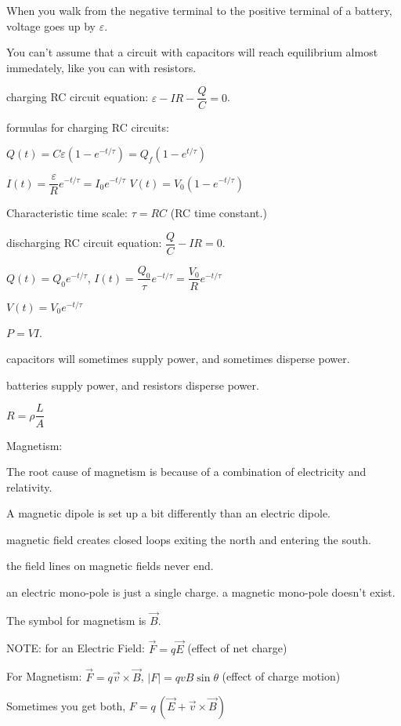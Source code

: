 \documentclass[12pt]{article}
\newcommand \dstyle \displaystyle
\begin{document}
When you walk from the negative terminal to the positive terminal of a battery,
voltage goes up by $\varepsilon$.

You can't assume that a circuit with capacitors will reach equilibrium almost immedately,
like you can with resistors.

charging RC circuit equation: $\varepsilon - IR - \dfrac Q C = 0$.

formulas for charging RC circuits:

$\dstyle Q(t) = C \varepsilon \! \left(1 - e^{-t / \tau}\right) = Q_f \! \left(1 - e^{t / \tau}\right)$

$\dstyle I(t) = \dfrac \varepsilon R e^{-t/\tau} = I_0 e^{-t/\tau}$
\hspace{20px}
$V(t) = V_0 \left(1 - e^{-t/\tau}\right)$

Characteristic time scale:
$\tau = RC$ (RC time constant.)

discharging RC circuit equation: $\dfrac Q C - I R = 0$.

$Q(t) = Q_0 e^{-t/\tau}$, $I(t) = \dfrac{Q_0} \tau e^{-t/\tau} = \dfrac{V_0} R e^{-t/\tau}$

$V(t) = V_0 e^{-t/\tau}$

$P = V I$.

\newpage

capacitors will sometimes supply power, and sometimes disperse power.

batteries supply power, and resistors disperse power.

$R = \rho \dfrac L A$

{\Large Magnetism:}

The root cause of magnetism is because of a combination of electricity and relativity.

A magnetic dipole is set up a bit differently than an electric dipole.

magnetic field creates closed loops exiting the north and entering the south.

the field lines on magnetic fields never end.

an electric mono-pole is just a single charge. a magnetic mono-pole doesn't exist.

The symbol for magnetism is $\vec B$.

NOTE: for an Electric Field: $\vec F = q \vec E$ (effect of net charge)

For Magnetism: $\vec F = q \vec v \times \vec B$, $|F| = q v B \sin \theta$ (effect of charge motion)

Sometimes you get both, $F = q \, (\vec E + \vec v \times \vec B)$
\end{document}
